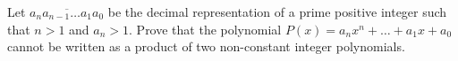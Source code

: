 Let $\overline{a_{n}a_{n-1}\ldots a_{1}a_{0}}$ be the decimal representation of a prime positive integer such that $n>1$ and $a_{n}>1$. Prove that the polynomial $P(x)=a_{n}x^{n}+\ldots +a_{1}x+a_{0}$ cannot be written as a product of two non-constant integer polynomials.